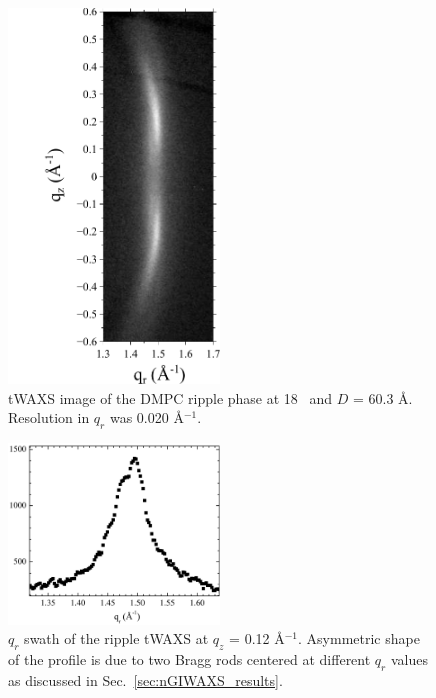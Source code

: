 \begin{figure}[htbp]
  \centering
  \includegraphics[trim=20 0 10 0,clip,width=0.5\textwidth]{figures/ripple/tWAXS/twaxs_ripple}
  \caption[tWAXS image of the DMPC ripple phase]{tWAXS image of the DMPC
  ripple phase at 18 \textcelsius\ and $D$ = 60.3 \AA. 
  Resolution in $q_r$ was 0.020 \AA$^{-1}$.}
  \label{fig:twaxs_ripple}
\end{figure}

\begin{figure}[htbp]
  \centering
  \includegraphics[width=0.5\textwidth]{figures/ripple/tWAXS/twaxs_weak_qr}
  \caption{$q_r$ swath of the ripple tWAXS at $q_z$ = 0.12 \AA$^{-1}$. 
  Asymmetric shape of the profile is due to
  two Bragg rods centered at different $q_r$ values as discussed in
  Sec.~\ref{sec:nGIWAXS_results}.}
  \label{fig:twaxs_weak_qr}
\end{figure}

